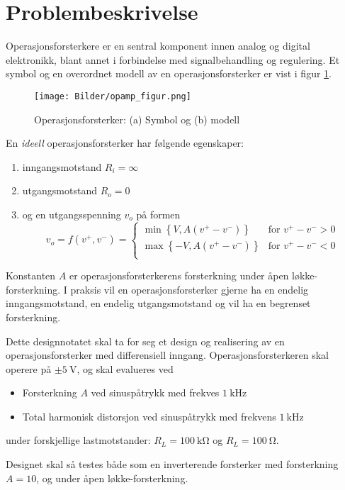 \section{Problembeskrivelse}
\label{problemBeskrivelse}

Operasjonsforsterkere er en sentral komponent innen analog og digital elektronikk,
blant annet i forbindelse med signalbehandling og regulering. Et symbol og en overordnet 
modell av en operasjonsforsterker er vist i figur \ref{fig:opamp}.

\begin{figure}[H]
    \centering
    \texttt{[image: Bilder/opamp\_figur.png]}
    \caption{Operasjonsforsterker: (a) Symbol og (b) modell \cite{problem_stilling}}
    \label{fig:opamp}
\end{figure}

En \textit{ideell} operasjonsforsterker har følgende egenskaper:
\begin{enumerate}
    \item inngangsmotstand $R_{i} = \infty$
    \item utgangsmotstand $R_{o} = 0$
    \item og en utgangsspenning $v_{o}$ på formen
        \begin{equation}
            v_{o} = f(v^{+}, v^{-}) = 
            \begin{cases}
                \min{\left\{V, A(v^{+} - v^{-})\right\}} & \text{for } v^{+} - v^{-} > 0 \\
                \max{\left\{-V, A(v^{+} - v^{-})\right\}} & \text{for } v^{+} - v^{-} < 0 \\
            \end{cases}
        \end{equation}
\end{enumerate}

Konstanten $A$ er operasjonsforsterkerens forsterkning under åpen løkke-forsterkning.
I praksis vil en operasjonsforsterker gjerne ha en endelig inngangsmotstand, en endelig utgangsmotstand og 
vil ha en begrenset forsterkning.

Dette designnotatet skal ta for seg et design og realisering av en operasjonsforsterker 
med differensiell inngang. Operasjonsforsterkeren skal operere på $\pm \SI{5}{\volt}$,
og skal evalueres ved 
\begin{itemize}
    \item Forsterkning $A$ ved sinuspåtrykk med frekves $\SI{1}{\kilo\hertz}$
    \item Total harmonisk distorsjon ved sinuspåtrykk med frekvens $\SI{1}{\kilo\hertz}$
\end{itemize}
under forskjellige lastmotstander: $R_L = \SI{100}{\kilo\ohm}$ og $R_L = \SI{100}{\ohm}$.

Designet skal så testes både som en inverterende forsterker med forsterkning $A = 10$,
og under åpen løkke-forsterkning.
